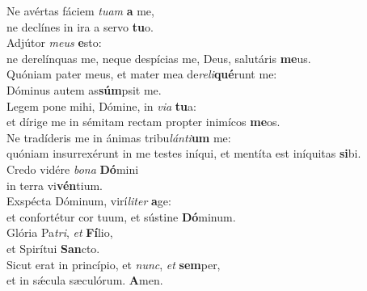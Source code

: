 \evenverse Ne avértas fáciem \textit{tu}\textit{am} \textbf{a} me,~\*\\
\evenverse ne declínes in ira a servo \textbf{tu}o.\\
\oddverse Adjútor \textit{me}\textit{us} \textbf{e}sto:~\*\\
\oddverse ne derelínquas me, neque despícias me, Deus, salutáris \textbf{me}us.\\
\evenverse Quóniam pater meus, et mater mea de\textit{re}\textit{li}\textbf{qué}runt me:~\*\\
\evenverse Dóminus autem as\textbf{súm}psit me.\\
\oddverse Legem pone mihi, Dómine, in \textit{vi}\textit{a} \textbf{tu}a:~\*\\
\oddverse et dírige me in sémitam rectam propter inimícos \textbf{me}os.\\
\evenverse Ne tradíderis me in ánimas tribu\textit{lán}\textit{ti}\textbf{um} me:~\*\\
\evenverse quóniam insurrexérunt in me testes iníqui, et mentíta est iníquitas \textbf{si}bi.\\
\oddverse Credo vidére \textit{bo}\textit{na} \textbf{Dó}mini~\*\\
\oddverse in terra vi\textbf{vén}tium.\\
\evenverse Exspécta Dóminum, virí\textit{li}\textit{ter} \textbf{a}ge:~\*\\
\evenverse et confortétur cor tuum, et sústine \textbf{Dó}minum.\\
\oddverse Glória Pa\textit{tri}, \textit{et} \textbf{Fí}lio,~\*\\
\oddverse et Spirítui \textbf{San}cto.\\
\evenverse Sicut erat in princípio, et \textit{nunc}, \textit{et} \textbf{sem}per,~\*\\
\evenverse et in sǽcula sæculórum. \textbf{A}men.\\
